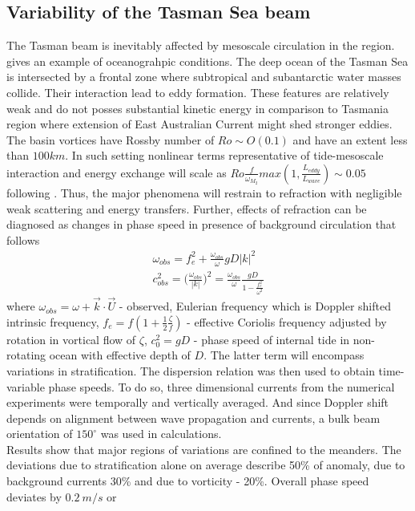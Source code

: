 \documentclass[12pt]{article}
\begin{document}
\subsection{Variability of the Tasman Sea beam}
The Tasman beam is inevitably affected by mesoscale circulation in the region. 
 gives an example of oceanograhpic conditions. The 
deep ocean of the Tasman Sea is intersected by a frontal zone where subtropical and subantarctic water masses collide. Their interaction lead to eddy formation. These features are relatively weak and do not posses substantial kinetic energy in comparison to Tasmania region where extension of East Australian Current might shed stronger eddies. The basin vortices have Rossby number of $Ro \sim O(0.1)$ and have an extent less than $100km$. In such setting nonlinear terms representative of tide-mesoscale interaction and energy exchange will scale as $Ro\frac{f}{\omega_{M_2}} max(1, \frac{L_{eddy}}{L_{wave}}) \sim 0.05$ following \cite{dunphy2017low}. Thus, the major phenomena will restrain to refraction with negligible weak scattering and energy transfers. Further, effects of refraction can be diagnosed as changes in phase speed in presence of background circulation \citep{zaron2014time} that follows
\begin{align}
\omega_{obs} = f_e^2 + \frac{\omega_{obs}}{\omega} gD |k|^2\\
c_{obs}^2 = \big( \frac{\omega_{obs}}{|k|} \big)^2 = \frac{\omega_{obs}}{\omega} \frac{gD}{1 - 
\frac{f_e^2}{\omega^2}}
\end{align}
where $\omega_{obs} = \omega + \vec{k}\cdot \vec{U}$ - observed, Eulerian frequency which is 
Doppler shifted intrinsic frequency, $f_e = f(1 + \frac{1}{2} \frac{\zeta}{f})$ - effective 
Coriolis frequency adjusted by rotation in vortical flow of $\zeta$, $c_0^2 = gD$ - phase speed of 
internal tide in non-rotating ocean with effective depth of $D$. The latter term will encompass 
variations in stratification. The dispersion relation was then used to obtain time-variable phase 
speeds. To do so, three dimensional currents from the numerical experiments were temporally and 
vertically averaged. And since Doppler shift depends on alignment between wave propagation and 
currents, a bulk beam orientation of $150^\circ$ was used in calculations.\\
Results  show that major regions of variations are confined to the 
meanders. The deviations due to stratification alone on average describe 50\% of anomaly, due to 
background currents 30\% and due to vorticity - 20\%. Overall phase speed deviates by $0.2~m/s$ or 
\end{document}
